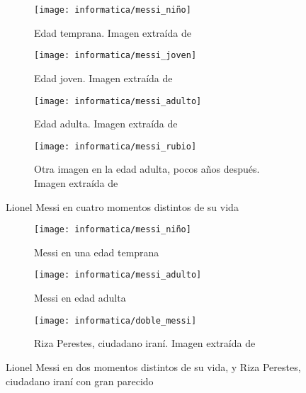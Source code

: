 \begin{figure}[H]
\centering
    \begin{subfigure}{0.5\textwidth}
        \centering
        \texttt{[image: informatica/messi\_niño]}
        \caption{Edad temprana. Imagen extraída de \cite{informatica:webimg_messi_pequeno}}
        \label{img:messi_pequeno}
    \end{subfigure}%
    \begin{subfigure}{.5\textwidth}
        \centering
        \texttt{[image: informatica/messi\_joven]}
        \caption{Edad joven. Imagen extraída de \cite{informatica:webimg_messi_joven}}
    \end{subfigure}%

    \begin{subfigure}{.5\textwidth}
        \centering
        \texttt{[image: informatica/messi\_adulto]}
        \caption{Edad adulta. Imagen extraída de \cite{informatica:webimg_messi_adulto}}
        \label{img:messi_adulto}
    \end{subfigure}%
    \begin{subfigure}{.5\textwidth}
        \centering
        \texttt{[image: informatica/messi\_rubio]}
        \caption{Otra imagen en la edad adulta, pocos años después. Imagen extraída de \cite{informatica:webimg_messi_rubio}}
    \end{subfigure}

    \caption{Lionel Messi en cuatro momentos distintos de su vida}
    \label{img:messi_cuatro_edades}

\end{figure}

\begin{figure}[hbtp]
\centering
    \begin{subfigure}{0.5\textwidth}
        \centering
        \texttt{[image: informatica/messi\_niño]}
        \caption{Messi en una edad temprana}
    \end{subfigure}%
    \begin{subfigure}{.5\textwidth}
        \centering
        \texttt{[image: informatica/messi\_adulto]}
        \caption{Messi en edad adulta}
    \end{subfigure}

    \begin{subfigure}{.8\textwidth}
        \centering
        \texttt{[image: informatica/doble\_messi]}
        \caption{Riza Perestes, ciudadano iraní. Imagen extraída de \cite{informatica:imitador_messi}}
    \end{subfigure}

\caption{Lionel Messi en dos momentos distintos de su vida, y Riza Perestes, ciudadano iraní con gran parecido}
\label{img:messi_distintos_otro_adulto}
\end{figure}

